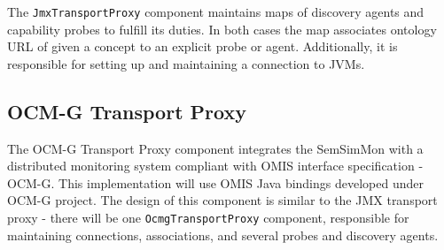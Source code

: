 The \texttt{JmxTransportProxy} component maintains maps of discovery agents and capability probes to fulfill its duties. In both cases the map associates ontology URL of given a concept to an explicit probe or agent. Additionally, it is responsible for setting up and maintaining a connection to JVMs.

\subsection{OCM-G Transport Proxy}

The OCM-G Transport Proxy component integrates the SemSimMon with a distributed monitoring system compliant with OMIS interface specification - OCM-G. This implementation will use OMIS Java bindings developed under OCM-G project. The design of this component is similar to the JMX transport proxy - there will be one \texttt{OcmgTransportProxy} component, responsible for maintaining connections, associations, and several probes and discovery agents.
